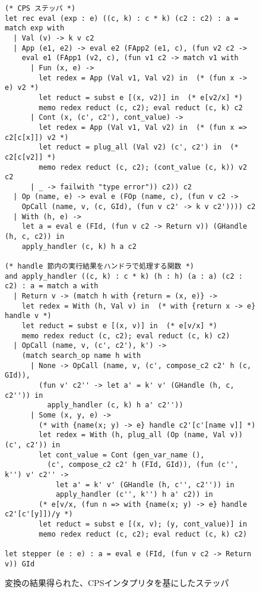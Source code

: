 \begin{figure}
\begin{verbatim}
(* CPS ステッパ *)
let rec eval (exp : e) ((c, k) : c * k) (c2 : c2) : a = match exp with
  | Val (v) -> k v c2
  | App (e1, e2) -> eval e2 (FApp2 (e1, c), (fun v2 c2 ->
    eval e1 (FApp1 (v2, c), (fun v1 c2 -> match v1 with
      | Fun (x, e) ->
        let redex = App (Val v1, Val v2) in  (* (fun x -> e) v2 *)
        let reduct = subst e [(x, v2)] in  (* e[v2/x] *)
        memo redex reduct (c, c2); eval reduct (c, k) c2
      | Cont (x, (c', c2'), cont_value) ->
        let redex = App (Val v1, Val v2) in  (* (fun x => c2[c[x]]) v2 *)
        let reduct = plug_all (Val v2) (c', c2') in  (* c2[c[v2]] *)
        memo redex reduct (c, c2); (cont_value (c, k)) v2 c2
      | _ -> failwith "type error")) c2)) c2
  | Op (name, e) -> eval e (FOp (name, c), (fun v c2 ->
    OpCall (name, v, (c, GId), (fun v c2' -> k v c2')))) c2
  | With (h, e) ->
    let a = eval e (FId, (fun v c2 -> Return v)) (GHandle (h, c, c2)) in
    apply_handler (c, k) h a c2

(* handle 節内の実行結果をハンドラで処理する関数 *)
and apply_handler ((c, k) : c * k) (h : h) (a : a) (c2 : c2) : a = match a with
  | Return v -> (match h with {return = (x, e)} ->
    let redex = With (h, Val v) in  (* with {return x -> e} handle v *)
    let reduct = subst e [(x, v)] in  (* e[v/x] *)
    memo redex reduct (c, c2); eval reduct (c, k) c2)
  | OpCall (name, v, (c', c2'), k') ->
    (match search_op name h with
      | None -> OpCall (name, v, (c', compose_c2 c2' h (c, GId)),
        (fun v' c2'' -> let a' = k' v' (GHandle (h, c, c2'')) in
          apply_handler (c, k) h a' c2''))
      | Some (x, y, e) ->
        (* with {name(x; y) -> e} handle c2'[c'[name v]] *)
        let redex = With (h, plug_all (Op (name, Val v)) (c', c2')) in
        let cont_value = Cont (gen_var_name (),
          (c', compose_c2 c2' h (FId, GId)), (fun (c'', k'') v' c2'' ->
            let a' = k' v' (GHandle (h, c'', c2'')) in
            apply_handler (c'', k'') h a' c2)) in
        (* e[v/x, (fun n => with {name(x; y) -> e} handle c2'[c'[y]])/y *)
        let reduct = subst e [(x, v); (y, cont_value)] in
        memo redex reduct (c, c2); eval reduct (c, k) c2)

let stepper (e : e) : a = eval e (FId, (fun v c2 -> Return v)) GId
\end{verbatim}
\caption{変換の結果得られた、CPSインタプリタを基にしたステッパ}
\label{figure:6cps}
\end{figure}

